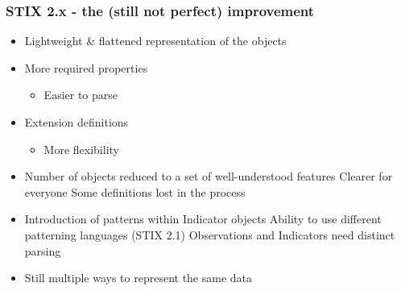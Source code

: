 \begin{frame}
    \frametitle{STIX 2.x - the (still not perfect) improvement}
    \begin{itemize}
        \item Lightweight \& flattened representation of the objects
        \item More required properties
        \begin{itemize}
            \item Easier to parse
        \end{itemize}
        \item Extension definitions
        \begin{itemize}
            \item More flexibility
        \end{itemize}
        \item Number of objects reduced to a set of well-understood features
        \linebreak \faPlusCircle \hspace{0.3em} Clearer for everyone
        \linebreak \faMinusCircle \hspace{0.3em} Some definitions lost in the process
        \item Introduction of patterns within Indicator objects
        \linebreak \faPlusCircle \hspace{0.3em} Ability to use different patterning languages (STIX 2.1)
        \linebreak \faMinusCircle \hspace{0.3em} Observations and Indicators need distinct parsing
        \item Still multiple ways to represent the same data
    \end{itemize}
\end{frame}

